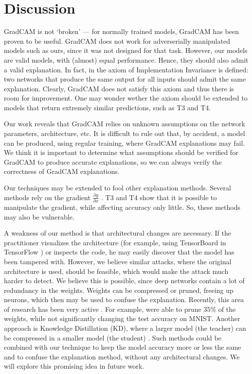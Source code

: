 \documentclass{article}
\begin{document}
\section{Discussion}

GradCAM is not `broken' --- for normally trained models, GradCAM has been proven to be useful. GradCAM does not work for adverserially manipulated models such as ours, since it was not designed for that task. However, our models are valid models, with (almost) equal performance. Hence, they should also admit a valid explanation. In fact, in \cite{AxiomaticAttribution} the axiom of Implementation Invariance is defined: two networks that produce the same output for all inputs should admit the same explanation. Clearly, GradCAM does not satisfy this axiom and thus there is room for improvement. One may wonder wether the axiom should be extended to models that return extremely similar predictions, such as T3 and T4. 

Our work reveals that GradCAM relies on unknown assumptions on the network parameters, architecture, etc. It is difficult to rule out that, by accident, a model can be produced, using regular training, where GradCAM explanations may fail. We think it is important to determine what assumptions should be verified for GradCAM to produce accurate explanations, so we can always verify the correctness of GradCAM explanations. 

Our techniques may be extended to fool other explanation methods. Several methods rely on the gradient $\frac{\partial y}{\partial x}$ \citep{AxiomaticAttribution, simplegrad, gradientTimesInput, smoothgrad, LIME}. T3 and T4 show that it is possible to manipulate the gradient, while affecting accuracy only little. So, these methods may also be vulnerable. 

A weakness of our method is that architectural changes are necessary. If the practitioner visualizes the architecture (for example, using TensorBoard in TensorFlow \citep{tensorflow2015-whitepaper}) or inspects the code, he may easily discover that the model has been tampered with. However, we believe similar attacks, where the original architecture is used, should be feasible, which would make the attack much harder to detect. We believe this is possible, since deep networks contain a lot of redundancy in the weights. Weights can be compressed or pruned, freeing up neurons, which then may be used to confuse the explanation. Recently, this area of research has been very active \citep{compressionsurvey1,compressionsurvey2}. For example, \citet{pruning} were able to prune $35\%$ of the weights, while not significantly changing the test accuracy on MNIST. Another approach is Knowledge Distillation (KD), where a larger model (the teacher) can be compressed in a smaller model (the student) \citep{ba2014deep}. Such methods could be combined with our technique to keep the model accuracy more or less the same and to confuse the explanation method, without any architectural changes. We will explore this promising idea in future work. 
\end{document}

